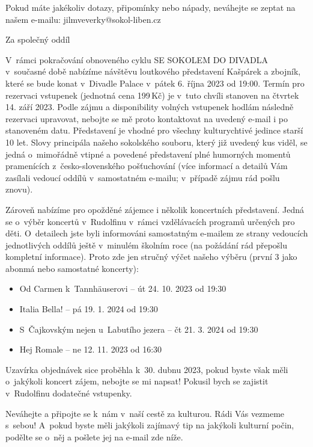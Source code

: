 \documentclass[11pt]{article}
\begin{document}
\noindent
Pokud máte jakékoliv dotazy, připomínky nebo nápady, neváhejte se zeptat na našem e-mailu: jilmveverky@sokol-liben.cz

Za společný oddíl
 
\signature{Bára Jeníková}{}

\clearpage

V~rámci pokračování obnoveného cyklu SE SOKOLEM DO DIVADLA v~současné době nabízíme návštěvu loutkového představení Kašpárek a zbojník, které se bude konat v~Divadle Palace v~pátek 6. října 2023 od 19:00. Termín pro rezervaci vstupenek (jednotná cena 199\,Kč) je v~tuto chvíli stanoven na čtvrtek 14. září 2023. Podle zájmu a disponibility volných vstupenek hodlám následně rezervaci upravovat, nebojte se mě proto kontaktovat na uvedený e-mail i po stanoveném datu.
Představení je vhodné pro všechny kulturychtivé jedince starší 10 let.
Slovy principála našeho sokolského souboru, který již uvedený kus viděl, se jedná o~mimořádně vtipné a povedené představení plné humorných momentů pramenících z~česko-slovenského \luv{}pošťuchování\ruv{} (více informací a detailů Vám zasílali vedoucí oddílů v~samostatném e-mailu; v~případě zájmu rád pošlu znovu).

Zároveň nabízíme pro opožděné zájemce i několik koncertních představení. Jedná se o~výběr koncertů v~Rudolfinu v~rámci vzdělávacích programů určených pro děti. O~detailech jste byli informováni samostatným e-mailem ze strany vedoucích jednotlivých oddílů ještě v~minulém školním roce (na požádání rád přepošlu kompletní informace). Proto zde jen stručný výčet našeho výběru (první 3 jako abonmá nebo samostatné koncerty):


\renewcommand{\arraystretch}{1}
\begin{itemize}
  \setlength\itemsep{-3pt}
  \item Od Carmen k~Tannhäuserovi – út 24. 10. 2023 od 19:30
  \item Italia Bella! – pá 19. 1. 2024 od 19:30
  \item S~Čajkovským nejen u~Labutího jezera – čt 21. 3. 2024 od 19:30
  \item Hej Romale – ne 12. 11. 2023 od 16:30
\end{itemize}

Uzavírka objednávek sice proběhla k~30. dubnu 2023, pokud byste však měli o~jakýkoli koncert zájem, nebojte se mi napsat! Pokusil bych se zajistit v~Rudolfinu dodatečné vstupenky.

Neváhejte a připojte se k~nám v~naší cestě za kulturou. Rádi Vás vezmeme s~sebou! A~pokud byste měli jakýkoli zajímavý tip na jakýkoli kulturní počin, podělte se o~něj a pošlete jej na e-mail zde níže.
\end{document}
